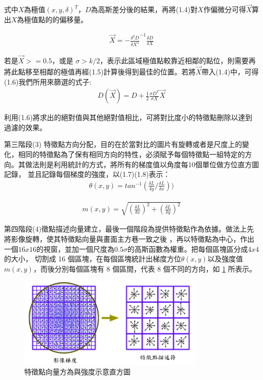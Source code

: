    式中$X$為極值$(x,y,\delta)^T$，$D$為高斯差分後的結果，再將(1.4)對$X$作偏微分可得$\vec{X}$算出$X$為極值點的的偏移量。
   
\begin{align}
  \vec{X} = -\frac{\delta^2 D}{\delta X^2}^{-1}\frac{\delta D}{\delta X}
\end{align}   
   
   
   若是$\vec{X} >= 0.5$，或是 $\sigma > k/2$，表示此區域極值點較靠近相鄰的點位，則需要再將此點移至相鄰的極值再經(1.5)計算後得到最佳的位置。若將$\vec{X}$帶入(1.4)中，可得(1.6)我們所用來篩選的式子:  
\begin{align}
  D(\vec{X}) = D+\frac{1}{2} \frac{\sigma D^T}{\sigma X} \vec{X}
\end{align}      
   
   利用(1.6)將求出的絕對值與其他絕對值相比，可將對比度小的特徵點刪除以達到過濾的效果。
   
   第三階段(3) 特徵點方向分配，目的在於當對比的圖片有旋轉或者是尺度上的變化，相同的特徵點為了保有相同方向的特性，必須賦予每個特徵點一組特定的方向。其做法則是利用統計的方式，將所有的梯度值以角度每10個單位做方位直方圖記錄，
並且記錄每個梯度的強度，以(1.7)(1.8)表示：
\begin{align}
	\theta (x,y)= tan^{-1}(\frac{\delta L}{\delta y}/\frac{\delta L}{\delta x}))
\end{align}      
   
\begin{align}
	m(x,y) = \sqrt{(\frac{\delta L}{\delta x})^2+(\frac{\delta L}{\delta y})^2}
\end{align}


   第四階段(4)徵點描述向量建立，最後一個階段為提供特徵點作為依據。做法上先將影像旋轉，使其特徵點向量與畫面主方巷一致之後
   ，再以特徵點為中心，作出一個$16 x 16$的視窗，並加一個尺度為$0.5\sigma$的高斯函數為權重。把每個區塊區分成$4 x 4$的大小，
   切割成 16 個區塊，在每個區塊統計出梯度方位$ \theta (x,y)$以及強度值$m(x,y)$，而後分別每個區塊有 8 個區間，代表 8 
   個不同的方向，如 \ref{fig:SIFT Histogram} 所表示。

\begin{figure}
\begin{center}
  \includegraphics[width=0.8\textwidth]{figures/SIFT_histogram.jpg}
  \caption{特徵點向量方為與強度示意直方圖}
  \label{fig:SIFT Histogram}
\end{center}
\end{figure}  

